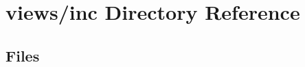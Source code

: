 \section{views/inc Directory Reference}
\label{dir_bd0787f77aa9ed83e661a89b26aaaa06}
\subsection*{Files}
\begin{DoxyCompactItemize}
\end{DoxyCompactItemize}
